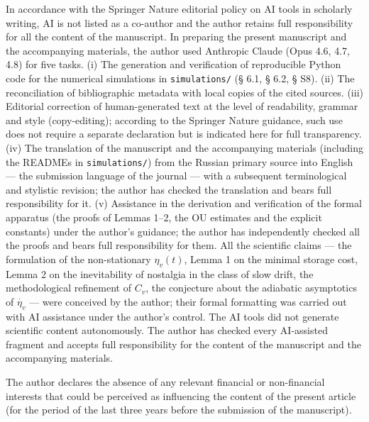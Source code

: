 \documentclass[pdflatex,sn-mathphys-ay]{sn-jnl}
\begin{document}
In accordance with the Springer Nature editorial policy on AI tools in scholarly writing, AI is not listed as a co-author and the author retains full responsibility for all the content of the manuscript. In preparing the present manuscript and the accompanying materials, the author used Anthropic Claude (Opus 4.6, 4.7, 4.8) for five tasks. (i) The generation and verification of reproducible Python code for the numerical simulations in \texttt{simulations/} (§ 6.1, § 6.2, § S8). (ii) The reconciliation of bibliographic metadata with local copies of the cited sources. (iii) Editorial correction of human-generated text at the level of readability, grammar and style (copy-editing); according to the Springer Nature guidance, such use does not require a separate declaration but is indicated here for full transparency. (iv) The translation of the manuscript and the accompanying materials (including the READMEs in \texttt{simulations/}) from the Russian primary source into English --- the submission language of the journal --- with a subsequent terminological and stylistic revision; the author has checked the translation and bears full responsibility for it. (v) Assistance in the derivation and verification of the formal apparatus (the proofs of Lemmas 1--2, the OU estimates and the explicit constants) under the author's guidance; the author has independently checked all the proofs and bears full responsibility for them. All the scientific claims --- the formulation of the non-stationary \(\eta_v(t)\), Lemma 1 on the minimal storage cost, Lemma 2 on the inevitability of nostalgia in the class of slow drift, the methodological refinement of \(C_v\), the conjecture about the adiabatic asymptotics of \(\dot{\eta_v}\) --- were conceived by the author; their formal formatting was carried out with AI assistance under the author's control. The AI tools did not generate scientific content autonomously. The author has checked every AI-assisted fragment and accepts full responsibility for the content of the manuscript and the accompanying materials.

The author declares the absence of any relevant financial or non-financial interests that could be perceived as influencing the content of the present article (for the period of the last three years before the submission of the manuscript).



\nocite{*}

\end{document}
